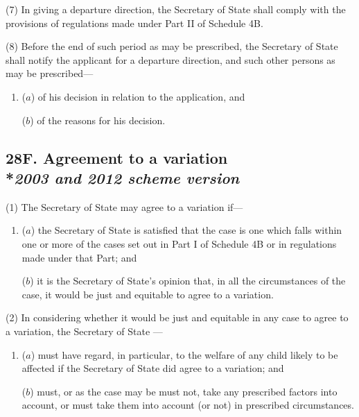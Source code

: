 \documentclass[12pt,a4paper]{article}
\begin{document}
(7) In giving a departure direction, the Secretary of State shall comply with the provisions of regulations made under Part II of Schedule 4B.

(8) Before the end of such period as may be prescribed, the Secretary of State shall notify the applicant for a departure direction, and such other persons as may be prescribed—
\begin{enumerate}\item[]
($a$) of his decision in relation to the application, and

($b$) of the reasons for his decision.
\end{enumerate}


\subsection[28F. Agreement to a variation --- \emph{2003 and 2012 scheme version}]{28F. Agreement to a variation\\*\emph{2003 and 2012 scheme version}}

(1) The 
Secretary of State  %
may agree to a variation if—
\begin{enumerate}\item[]
($a$) 
the Secretary of State  %
is satisfied that the case is one which falls within one or more of the cases set out in Part I of Schedule 4B or in regulations made under that Part; and

($b$) it is 
the Secretary of State's  %
opinion that, in all the circumstances of the case, it would be just and equitable to agree to a variation.
\end{enumerate}

(2) In considering whether it would be just and equitable in any case to agree to a variation, the 
Secretary of State%
---
\begin{enumerate}\item[]
($a$) must have regard, in particular, to the welfare of any child likely to be affected if 
the Secretary of State  %
did agree to a variation; and

($b$) must, or as the case may be must not, take any prescribed factors into account, or must take them into account (or not) in prescribed circumstances.
\end{enumerate}
\end{document}
